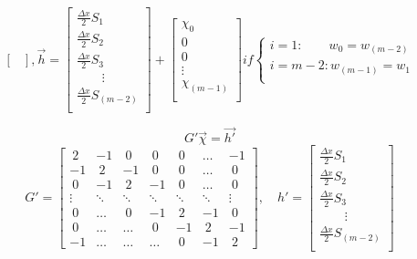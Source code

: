 \documentclass[a4paper,fleqn,10pt]{report}
\begin{document}
\begin{CJK*}{UTF8}{bsmi}
\begin{equation*}
\begin{bmatrix}
\end{bmatrix}, 
\vec{h} =
\begin{bmatrix}
        \frac{\Delta x}{2}S_{1} \\
        \frac{\Delta x}{2}S_{2} \\
        \frac{\Delta x}{2}S_{3} \\
        ~~~~~~~~~\vdots ~~~ \\
        \frac{\Delta x}{2}S_{(m-2)} \\
\end{bmatrix}
+
\begin{bmatrix}
        \chi_{0}  \\
        0    	\\
        0   	\\
		\vdots  \\
	\chi_{(m-1)}  \\
        
\end{bmatrix}
if
\begin{cases}
i = 1:\qquad w_{0} = w_{(m-2)}\\
i = m-2: w_{(m-1)} = w_{1}\\

\end{cases}
\end{equation*}

\begin{equation*}
G'\vec{\chi} = \vec{h'}
\end{equation*}
\begin{equation*}
G' = 
\begin{bmatrix}
        ~2 & -1 & ~0 & ~0 & ~0 & \ldots & -1 \\
        -1 & ~2 & -1 & ~0 & ~0 & \ldots & ~0 \\
        ~0 & -1 & ~2 & -1 & ~0 & \ldots & ~0 \\
        \vdots & \ddots & \ddots & \ddots & \ddots & \ddots & \vdots \\
        ~0 & \ldots & ~0 & -1 & ~2 & -1 & ~0 \\
        ~0 & \ldots & \ldots & ~0 & -1 & ~2 & -1 \\
        -1 & \ldots & \ldots & \ldots & ~0 & -1 & ~2

\end{bmatrix}
, \quad
h' = 
\begin{bmatrix}
        \frac{\Delta x}{2}S_{1} \\
        \frac{\Delta x}{2}S_{2} \\
        \frac{\Delta x}{2}S_{3} \\
        ~~~~~~~~~\vdots ~~~ \\
        \frac{\Delta x}{2}S_{(m-2)} \\


\end{bmatrix}
\end{equation*}
\end{CJK*}
\end{document}
